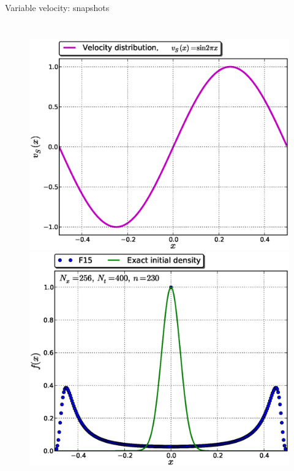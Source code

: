 \documentclass{beamer}
\begin{document}

\begin{frame}{Variable velocity: snapshots}
\vspace*{-5.5mm}
\begin{columns}
\begin{figure}
\centering
 \includegraphics[width=\textwidth]{graphics/v_S_annotated}\\ \vspace*{-4mm}
 \includegraphics[width=\textwidth]{graphics/f_N_v_S_F15_Nx256Nt400_w_f0_it00230}

\end{figure}
\end{columns}
\end{frame}
\end{document}
